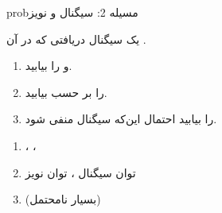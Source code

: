 \begin{PSbox}[unbreakable]{prob}{مسیله 2: سیگنال و نویز}

یک سیگنال دریافتی  که در آن .

\begin{enumerate}
\def\labelenumi{(\alph{enumi})}
\tightlist
\item
   و  را بیابید.
\item
   را بر حسب  بیابید.
\item
   را بیابید  احتمال این‌که سیگنال منفی شود.
\end{enumerate}

\PSsolution{} 

\begin{enumerate}
\def\labelenumi{(\alph{enumi})}
\item
  ، ، 
\item
  توان سیگنال ، توان نویز \PSbr{}
\item
   (بسیار نامحتمل)
\end{enumerate}

\end{PSbox}

